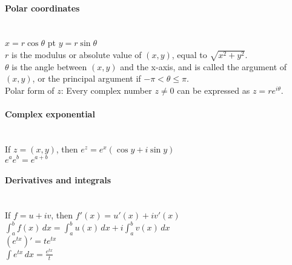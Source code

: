\documentclass[10pt]{article}
\begin{document}
\begin{addmargin}[3em]{2em}%

{\indent \paragraph{Polar coordinates}\ \\
$x = r \cos \theta$  pt $y = r \sin \theta$\\
$r$ is the modulus or absolute value of $(x,y)$, equal to $\sqrt{x^2+y^2}$.\\
$\theta$ is the angle between $(x,y)$ and the x-axis, and is called the argument of $(x,y)$,
or the principal argument if $-\pi < \theta \leq \pi$.\\
Polar form of $z$: Every complex number $z \neq 0$ can be expressed as $z=re^{i\theta}$.}

\end{addmargin}


\paragraph{Complex exponential}\ \\
If $z=(x,y)$, then $e^z = e^x(\cos y + i \sin y)$\\
$e^ae^b=e^{a+b}$

\paragraph{Derivatives and integrals}\ \\
If $f=u+iv$, then $f'(x)=u'(x)+iv'(x)$\\
$\int_a^bf(x)\,dx=\int_a^bu(x)\,dx+i\int_a^bv(x)\,dx$\\
$(e^{tx})'=te^{tx}$\\
$\int e^{tx}\,dx=\frac{e^{tx}}{t}$
\end{document}
